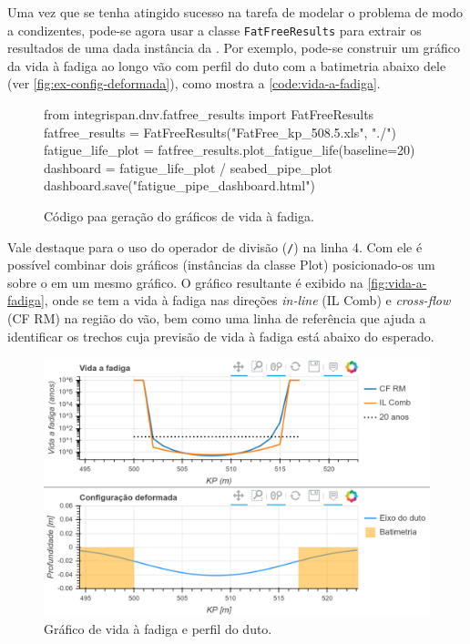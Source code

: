 Uma vez que se tenha atingido sucesso na tarefa de modelar o problema de modo a condizentes, pode-se agora usar a classe \texttt{FatFreeResults} para extrair os resultados de uma dada instância da \fatfree. Por exemplo, pode-se construir um gráfico da vida à fadiga ao longo vão com perfil do duto com a batimetria abaixo dele (ver \autoref{fig:ex-config-deformada}), como mostra a \autoref{code:vida-a-fadiga}.

\begin{figure}[!ht]
	\caption{Código paa geração do gráficos de vida à fadiga.}\label{code:vida-a-fadiga}
	\begin{pythoncode}
from integrispan.dnv.fatfree_results import FatFreeResults
fatfree_results = FatFreeResults("FatFree_kp_508.5.xls", "./")
fatigue_life_plot = fatfree_results.plot_fatigue_life(baseline=20)
dashboard = fatigue_life_plot / seabed_pipe_plot
dashboard.save("fatigue_pipe_dashboard.html")
	\end{pythoncode}
\end{figure}

Vale destaque para o uso do operador de divisão (\texttt{/}) na linha 4. Com ele é possível combinar dois gráficos (instâncias da classe Plot) posicionado-os um sobre o em um mesmo gráfico. O gráfico resultante é exibido na \autoref{fig:vida-a-fadiga}, onde se tem a vida à fadiga nas direções \textit{in-line} (IL Comb) e \textit{cross-flow} (CF RM) na região do vão, bem como uma linha de referência que ajuda a identificar os trechos cuja previsão de vida à fadiga está abaixo do esperado.

\begin{figure}[!ht]
	\centering
	\caption{Gráfico de vida à fadiga e perfil do duto.}\label{fig:vida-a-fadiga}
	\includegraphics[width=\textwidth]{imagens/exemplo/vida-a-fadiga}
\end{figure}
